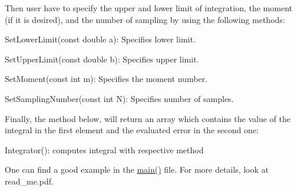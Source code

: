 Then user have to specify the upper and lower limit of integration, the moment (if it is desired), and the number of sampling by using the following methods\+:
\begin{DoxyEnumerate}
\item Set\+Lower\+Limit(const double a)\+: Specifies lower limit.
\item Set\+Upper\+Limit(const double b)\+: Specifies upper limit.
\item Set\+Moment(const int m)\+: Specifies the moment number.
\item Set\+Sampling\+Number(const int N)\+: Specifies number of samples.
\end{DoxyEnumerate}

Finally, the method below, will return an array which contains the value of the integral in the first element and the evaluated error in the second one\+:
\begin{DoxyEnumerate}
\item Integrator()\+: computes integral with respective method
\end{DoxyEnumerate}

One can find a good example in the \hyperlink{main_8cpp_ae66f6b31b5ad750f1fe042a706a4e3d4}{main()} file. For more details, look at read\+\_\+me.\+pdf. 